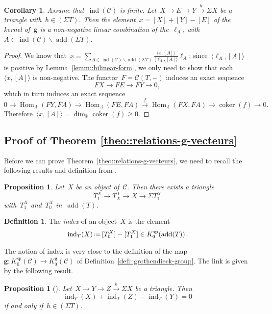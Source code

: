\documentclass{amsart}
\newtheorem{corollary}[theorem]{Corollary}
\newtheorem{proposition}[theorem]{Proposition}
\theoremstyle{definition}
\newtheorem{definition}[theorem]{Definition}
\renewcommand{\b}[1]{{\boldsymbol{#1}}} %
\newcommand{\ssm}{\smallsetminus} %
\newcommand{\eqdef}{\mbox{\,\raisebox{0.2ex}{\scriptsize\ensuremath{\mathrm:}}\ensuremath{=}\,}} %
\newcommand{\darkblue}{\color{darkblue}} %
\newcommand{\defn}[1]{\textsl{\darkblue #1}} %
\newcommand{\field}{\mathbb{K}}
\newcommand{\cat}{\mathcal{C}}
\newcommand{\Hom}[1]{\operatorname{Hom}_{#1}}
\newcommand{\susp}{\Sigma}
\newcommand{\add}{\operatorname{add}}
\newcommand{\spl}{\operatorname{sp}}
\newcommand{\Ksp}{K_0^{\spl}}
\newcommand{\Kg}{K_0^{\b{g}}}
\newcommand{\ind}{\operatorname{ind}}
\newcommand{\coker}{\operatorname{coker}}
\begin{document}
\begin{corollary}
\label{corollary::meshes positively generate cluster cats}
 Assume that~$\ind(\cat)$ is finite.  Let~$X\xrightarrow{} E \xrightarrow{} Y \xrightarrow{h} \susp X$ be a triangle with~$h\in (\susp T)$.  Then the element~$x=[X]+[Y]-[E]$ of the kernel of~$\b g$ is a non-negative linear combination of the~$\ell_A$, with~$A\in \ind(\cat)\ssm \add(\susp T)$.
\end{corollary}
\begin{proof}
 We know that~$x=\sum_{A\in \ind(\cat) \ssm \add(\susp T)} \frac{\langle x, [A] \rangle}{\langle \ell_A, [A] \rangle} \ell_A$; since~$\langle \ell_A, [A] \rangle$ is positive by Lemma~\ref{lemm::bilinear-form}, we only need to show that each~$\langle x, [A] \rangle$ is non-negative. 
 The functor~$F=\cat(T,-)$ induces an exact sequence
 \[
  FX \to FE \to FY \to 0,
 \]
 which in turn induces an exact sequence
 \[
  0\to \Hom{\Lambda}(FY, FA) \to \Hom{\Lambda}(FE, FA) \xrightarrow{f} \Hom{\Lambda}(FX, FA) \to \coker(f) \to 0.
 \]
 Therefore~$\langle x, [A] \rangle = \dim_{\field} \coker(f) \geq 0$.
\end{proof}


\subsection{Proof of Theorem \ref{theo::relations-g-vecteurs}}

Before we can prove Theorem~\ref{theo::relations-g-vecteurs}, we need to recall the following results and definition from \cite{DehyKeller,Palu}.

\begin{proposition}
 Let~$X$ be an object of~$\cat$. Then there exists a triangle
 \[
  T_1^X \to T^0_X \to X \to \susp T_1^X
 \]
 with~$T_1^X$ and~$T_0^X$ in~$\add(T)$.

\end{proposition}

\begin{definition}
 The \defn{index} of an object~$X$ is the element
 \[
  \ind_T(X) \eqdef [T_0^X] - [T_1^X] \in \Ksp(\add(T)).
 \]
\end{definition}

The notion of index is very close to the definition of the map~$\b g:\Ksp(\cat)\to \Kg(\cat)$ of Definition~\ref{defi::grothendieck-group}.  The link is given by the following result.

\begin{proposition}[\cite{Palu}]
 Let~$X\xrightarrow{} Y \xrightarrow{} Z \xrightarrow{h} \susp X$ be a triangle.
 Then
 \[
  \ind_T(X) + \ind_T(Z) - \ind_T(Y) = 0
 \]
 if and only if~$h\in (\susp T)$.
\end{proposition}
\end{document}
